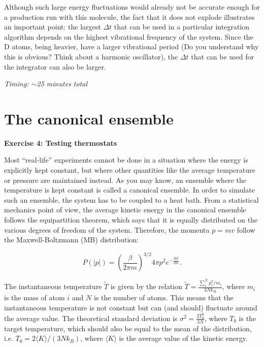 \documentclass[a4paper,11pt]{scrartcl}
\begin{document}
Although such large energy fluctuations would already not be accurate enough for a production run with this molecule, the fact that it does not explode illustrates an important point: 
the largest $\Delta t$ that can be used in a particular integration algorithm depends on the highest vibrational frequency of the system. 
Since the D atoms, being heavier, have a larger vibrational period (Do you understand why this is obvious? Think about a harmonic oscillator), the $\Delta t$ that can be used for the integrator can also be larger.


\textit{Timing: $\sim$25 minutes total}

\clearpage


\section*{The canonical ensemble}

{\large\textbf{Exercise 4: Testing thermostats}}

Most ``real-life'' experiments cannot be done in a situation where the energy is explicitly
kept constant, but where other quantities like the average temperature or pressure are
maintained instead. As you may know, an ensemble where the temperature is kept constant is called a canonical ensemble. 
In order to simulate such an ensemble, the system has to be coupled to a heat bath.
From a statistical mechanics point of view, the average kinetic energy in the canonical ensemble follows
the equipartition theorem, which says
that it is equally distributed on the various degrees of freedom of the system.
Therefore, the momenta $p=m v$ follow the Maxwell-Boltzmann (MB) distribution:

\begin{equation}\label{eq:MBdistr}
 P(|p|)=\left( \frac{\beta}{2\pi m} \right)^{3/2} 4\pi p^2 e^{-\frac{\beta p^2}{2m}}.
\end{equation}

The instantaneous temperature $\tilde{T}$ is given by the relation $\tilde{T} = \frac{\sum_i^N p_i^2/m_i}{3Nk_B}$, where $m_i$ is the mass of atom $i$ and $N$ is the number of atoms.
This means that the instantaneous temperature is not constant but can (and should) fluctuate around the average value.
The theoretical standard deviation is $\sigma^2 = \frac{2T_0^2}{3N}$, where $T_0$ is the target temperature, which should also be equal to the mean of the distribution, 
i.e. $T_0= 2 \langle K \rangle / (3 N k_B)$, where $\langle K \rangle$ is the average value of the kinetic energy.
\end{document}
